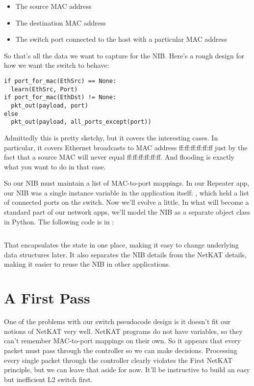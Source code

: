 \begin{itemize}
\item The source MAC address
\item The destination MAC address
\item The switch port connected to the host with a particular MAC address
\end{itemize}

So that's all the data we want to capture for the NIB.  Here's a rough design for how we want the switch to behave:

\begin{verbatim}
if port_for_mac(EthSrc) == None:
  learn(EthSrc, Port)
if port_for_mac(EthDst) != None:
  pkt_out(payload, port)
else
  pkt_out(payload, all_ports_except(port))
\end{verbatim}

Admittedly this is pretty sketchy, but it covers the interesting cases.  In particular, it covers
Ethernet broadcasts to MAC address ff:ff:ff:ff:ff:ff just by the fact that a source MAC will never
equal ff:ff:ff:ff:ff:ff.  And flooding is exactly what you want to do in that case.

So our NIB must maintain a list of MAC-to-port mappings.  
In our Repeater app, our NIB was a single instance variable in the application itself:
, which held a list of connected ports on the switch.  
Now we'll evolve a little.
In what will become a standard
part of our network apps, we'll model the NIB as a separate object class in Python.  
The following code is in :

\inputminted{python}{code/l2_learning_switch/network_information_base.py}

That 
encapsulates the state in one place, making it easy to change underlying data structures later.
It also separates the NIB details from the NetKAT details, making it easier to reuse the NIB
in other applications.  

\section{A First Pass}

One of the problems with our switch pseudocode design is it doesn't fit our notions of NetKAT very well.
NetKAT programs do not have variables, so they can't remember MAC-to-port mappings on their own.
So it appears that every packet must pass through the controller so we can make decisions.
Processing every single packet through the controller clearly violates the First NetKAT principle, but
we can leave that aside for now.  It'll be instructive to build an easy but inefficient L2 switch first.


